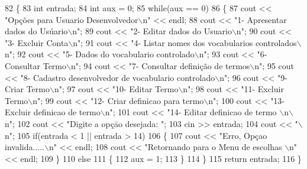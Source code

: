 \begin{DoxyCode}
82 \{
83   \textcolor{keywordtype}{int} entrada;
84   \textcolor{keywordtype}{int} aux = 0;
85   \textcolor{keywordflow}{while}(aux == 0)
86   \{
87       cout << \textcolor{stringliteral}{"Opções para Usuario Desenvolvedor\(\backslash\)n"} << endl;
88       cout << \textcolor{stringliteral}{"1- Apresentar dados do Usúario\(\backslash\)n"};
89       cout << \textcolor{stringliteral}{"2- Editar dados do Usuario\(\backslash\)n"};
90       cout << \textcolor{stringliteral}{"3- Excluir Conta\(\backslash\)n"};
91       cout << \textcolor{stringliteral}{"4- Listar nomes dos vocabularios controlados\(\backslash\)n"};
92       cout << \textcolor{stringliteral}{"5- Dados do vocabulario controlado\(\backslash\)n"};
93       cout << \textcolor{stringliteral}{"6- Consultar Termo\(\backslash\)n"};
94       cout << \textcolor{stringliteral}{"7- Consultar definição de termos\(\backslash\)n"};
95       cout << \textcolor{stringliteral}{"8- Cadastro desenvolvedor de vocabulario controlado\(\backslash\)n"};
96       cout << \textcolor{stringliteral}{"9- Criar Termo\(\backslash\)n"};
97       cout << \textcolor{stringliteral}{"10- Editar Termo\(\backslash\)n"};
98       cout << \textcolor{stringliteral}{"11- Excluir Termo\(\backslash\)n"};
99       cout << \textcolor{stringliteral}{"12- Criar definicao para termo\(\backslash\)n"};
100       cout << \textcolor{stringliteral}{"13- Excluir definicao de termo\(\backslash\)n"};
101       cout << \textcolor{stringliteral}{"14- Editar definicao de termo \(\backslash\)n\(\backslash\)n"};
102       cout << \textcolor{stringliteral}{"Digite a opçāo desejada: "};
103       cin >> entrada;
104       cout << \textcolor{stringliteral}{"\(\backslash\)n"};
105       \textcolor{keywordflow}{if}(entrada < 1 || entrada > 14)
106       \{
107         cout << \textcolor{stringliteral}{"Erro, Opçao invalida.....\(\backslash\)n"} << endl;
108         cout << \textcolor{stringliteral}{"Retornando para o Menu de escolhas \(\backslash\)n"} << endl;
109       \}
110       \textcolor{keywordflow}{else}
111       \{
112         aux = 1;
113       \}
114   \}
115   \textcolor{keywordflow}{return} entrada;
116 \}
\end{DoxyCode}
\mbox{\label{class_controladora_apresentacao_usuario_a22b31c99a738845f00ec2703c1c6dded}} 
